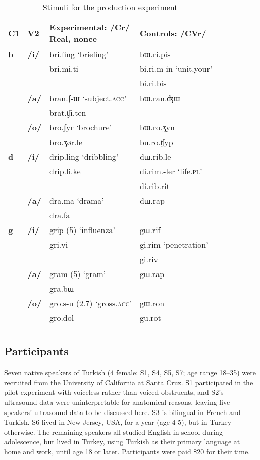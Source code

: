\documentclass[output=paper,colorlinks,citecolor=brown]{langscibook}
\begin{document}
\begin{table}
\caption{Stimuli for the production experiment}
\label{stimuli}
\begin{tabular}{llll}
\lsptoprule
C1 & V2 & \makecell{Experimental: /Cr/\\ Real, nonce} & Controls: /CVr/ \\
\midrule
\textbf{b} &	\textbf{/i/}	& bri.fing `briefing' & bɯ.ri.pis \\
 & &                            bri.mi.ti	  & bi.ri.m-in `unit.your' \\\addlinespace
& & & bi.ri.bis\\ 
&	\textbf{/a/} &	bran.ʃ-ɯ `subject.\textsc{acc}' & bɯ.ran.ʤɯ \\\addlinespace
& & brat.ʧi.ten	\\
& \textbf{/o/} &	bro.ʃyr `brochure' & bɯ.ro.ʒyn\\
& & bro.ʒør.le	& bu.ro.ʧyp\\\midrule
\textbf{d} &	\textbf{/i/} & 	drip.ling `dribbling' & dɯ.rib.le\\
& & drip.li.ke	& di.rim.-ler `life.\textsc{pl}'\\\addlinespace
& & & di.rib.rit\\
& \textbf{/a/} &	dra.ma `drama' & dɯ.rap\\
& & dra.fa	\\\midrule
\textbf{g} &	\textbf{/i/} &	grip (5) `influenza' &  gɯ.rif\\
& & gri.vi	& gi.rim `penetration'\\\addlinespace
& & & gi.riv\\
& \textbf{/a/} &	gram (5) `gram' & gɯ.rap\\\addlinespace
& & gra.bɯ	\\
& \textbf{/o/} &	gro.s-u (2.7) `gross.\textsc{acc}' & gɯ.ron \\
& & gro.dol	 & gu.rot\\
\lspbottomrule                
\end{tabular}
\end{table}

 

\subsection{Participants}

Seven native speakers of Turkish (4 female: S1, S4, S5, S7; age range 18--35) were recruited from the University of California at Santa Cruz. S1 participated in the pilot experiment with voiceless rather than voiced obstruents, and S2's ultrasound data were uninterpretable for anatomical reasons, leaving five speakers' ultrasound data to be discussed here. S3 is bilingual in French and Turkish. S6 lived in New Jersey, USA, for a year (age 4-5), but in Turkey otherwise. The remaining speakers all studied English in school during adolescence, but lived in Turkey, using Turkish as their primary language at home and work, until age 18 or later. Participants were paid \$20 for their time.
\end{document}
